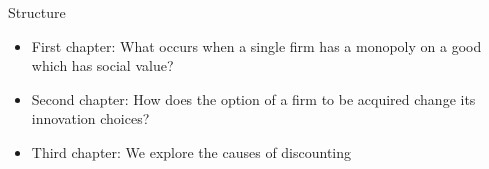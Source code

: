 \documentclass{beamer}
\numberwithin{equation}{section}
\begin{document}
\begin{frame}{Structure}
\begin{itemize}
    \item First chapter: What occurs when a single firm has a monopoly on a good which has social value? 
    \item Second chapter: How does the option of a firm to be acquired change its innovation choices?
    \item Third chapter: We explore the causes of discounting
\end{itemize}
\end{frame}

\end{document}
